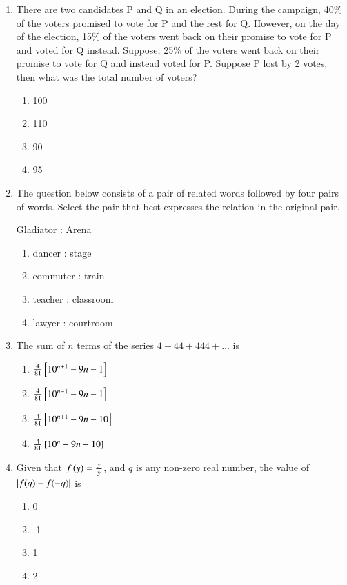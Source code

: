 \documentclass[journal,9pt,onecolumn]{IEEEtran}
\begin{document}
\begin{enumerate}
\item There are two candidates P and Q in an election. During the campaign, 40\% of the voters promised to vote for P and the rest for Q. However, on the day of the election, 15\% of the voters went back on their promise to vote for P and voted for Q instead. Suppose, 25\% of the voters went back on their promise to vote for Q and instead voted for P. Suppose P lost by 2 votes, then what was the total number of voters?
\begin{multicols}{4}
\begin{enumerate}
    \item 100
    \item 110
    \item 90
    \item 95
\end{enumerate}
\end{multicols}

\item The question below consists of a pair of related words followed by four pairs of words. Select the pair that best expresses the relation in the original pair.

Gladiator : Arena
\begin{multicols}{2}
\begin{enumerate}
    \item dancer : stage
    \item commuter : train
    \item teacher : classroom
    \item lawyer : courtroom
\end{enumerate}
\end{multicols}

\item The sum of $n$ terms of the series $4 + 44 + 444 + \ldots$ is
\begin{multicols}{2}
\begin{enumerate}
    \item $\frac{4}{81}{}\left[10^{n+1} - 9n-1\right]$
    \item $\frac{4}{81}{}\left[10^{n-1}- 9n - 1\right]$
    \item $\frac{4}{81}{}\left[10^{n+1} - 9n- 10\right]$
    \item $\frac{4}{81}{}\left[10^{n} - 9n - 10\right]$
\end{enumerate}
\end{multicols}

\item Given that $f\left(y\right)=\frac{\left\vert y\right\vert}{y}$, and $q$ is any non-zero real number, the value of $\left\vert f(q)-f(-q)\right\vert$ is
\begin{multicols}{4}
\begin{enumerate}
    \item 0
    \item -1
    \item 1
    \item 2
\end{enumerate}
\end{multicols}


\end{enumerate}
\end{document}
